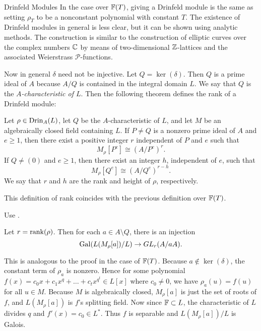 \documentclass[12pt]{article}
\begin{document}
\begin{section}{Drinfeld Modules}
In the case over ${\mathbb F}(T)$, giving a Drinfeld module is the same as setting
$\rho_T$ to be a nonconstant polynomial with constant $T$.  The existence
of Drinfeld modules in general is less clear, but it can be shown using
analytic methods.  The construction is similar to the construction of
elliptic curves over the complex numbers ${\mathbb C}$ by means of two-dimensional
${\mathbb Z}$-lattices and the associated Weierstrass ${\mathcal P}$-functions.

Now in general $\delta$ need not be injective.  Let $Q = \ker(\delta)$.
Then $Q$ is a prime ideal of $A$ because $A/Q$ is contained in the
integral domain $L$.  We say that $Q$ is the \emph{$A$-characteristic of
$L$}.  Then the following theorem defines the rank of a Drinfeld module:
\begin{theorem}
Let $\rho \in \operatorname{Drin}_A(L)$, let $Q$ be the $A$-characteristic of $L$, and
let $M$ be an algebraically closed field containing $L$.  If $P \neq Q$
is a nonzero prime ideal of $A$ and $e \geq 1$, then there exist a
positive integer $r$ independent of $P$ and $e$ such that
$$M_\rho[P^e] \cong (A/P^e)^r.$$
If $Q \neq (0)$ and $e \geq 1$, then there exist an integer $h$,
independent of $e$, such that
$$M_\rho[Q^e] \cong (A/Q^e)^{r-h}.$$
We say that $r$ and $h$ are the rank and height of $\rho$, respectively.
\end{theorem}

\begin{corollary}
This definition of rank coincides with the previous definition over
${\mathbb F}(T)$.  
\end{corollary}

\pf
Use .
\hamlos

\begin{proposition}
Let $r = \operatorname{rank}(\rho)$.  Then for each $a \in A\setminus Q$, there is an
injection $$\operatorname{Gal}(L(M_\rho[a])/L) \rightarrow GL_r(A/aA).$$
\end{proposition}

\pf
This is analogous to the proof in the case of ${\mathbb F}(T)$.  Because
$a \not\in \ker(\delta)$, the constant term of $\rho_a$ is nonzero.
Hence for some polynomial $f(x) = c_0x + c_1x^q + \ldots + c_tx^{q^t}
\in L[x]$ where $c_0 \neq 0$, we have $\rho_a(u) = f(u)$ for all
$u \in M$.  Because $M$ is algebraically closed, $M_\rho[a]$ is just the
set of roots of $f$, and $L(M_\rho[a])$ is $f$'s splitting field.  Now
since ${\mathbb F} \subset L$, the characteristic of $L$ divides $q$ and
$f'(x) = c_0 \in L^*$.  Thus $f$ is separable and $L(M_\rho[a])/L$ is
Galois.


\end{section}
\end{document}
